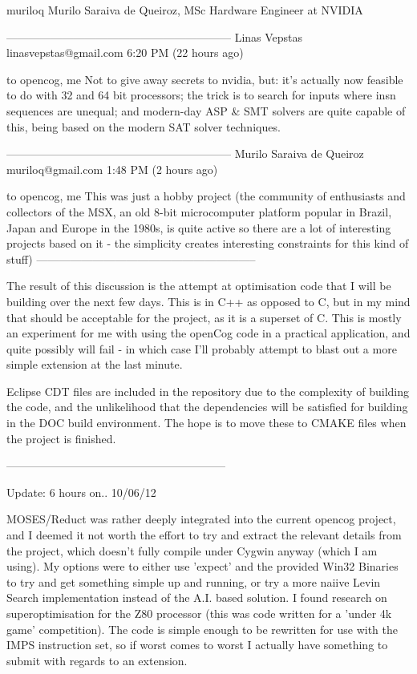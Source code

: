 \documentclass[11pt]{article}
\begin{document}
muriloq
Murilo Saraiva de Queiroz, MSc
Hardware Engineer at NVIDIA

------------------------------------------------------------
Linas Vepstas linasvepstas@gmail.com
6:20 PM (22 hours ago)

to opencog, me
Not to give away secrets to nvidia, but: it's actually now feasible to do with 32 and 64 bit processors; the trick is to search for inputs where insn sequences are unequal; and modern-day ASP & SMT solvers are quite capable of this, being based on the modern SAT solver techniques.

------------------------------------------------------------
Murilo Saraiva de Queiroz muriloq@gmail.com
1:48 PM (2 hours ago)

to opencog, me 
This was just a hobby project (the community of enthusiasts and collectors of the MSX, an old 8-bit microcomputer platform popular in Brazil, Japan and Europe in the 1980s, is quite active so there are a lot of interesting projects based on it - the simplicity creates interesting constraints for this kind of stuff)
-----------------------------------------------------------
 
The result of this discussion is the attempt at optimisation code that I will be building over the next few days. This is in C++ as opposed to C, but in my mind that should be acceptable for the project, as it is a superset of C. This is mostly an experiment for me with using the openCog code in a practical application, and quite possibly will fail - in which case I'll probably attempt to blast out a more simple extension at the last minute.

Eclipse CDT files are included in the repository due to the complexity of building the code, and the unlikelihood that the dependencies will be satisfied for building in the DOC build environment. The hope is to move these to CMAKE files when the project is finished.

-----------------------------------------------------------

Update: 6 hours on.. 10/06/12

MOSES/Reduct was rather deeply integrated into the current opencog project, and I deemed it not worth the effort to try and extract the relevant details from the project, which doesn't fully compile under Cygwin anyway (which I am using). My options were to either use 'expect' and the provided Win32 Binaries to try and get something simple up and running, or try a more naiive Levin Search implementation instead of the A.I. based solution. I found research on superoptimisation for the Z80 processor (this was code written for a 'under 4k game' competition). The code is simple enough to be rewritten for use with the IMPS instruction set, so if worst comes to worst I actually have something to submit with regards to an extension.
\end{document}
